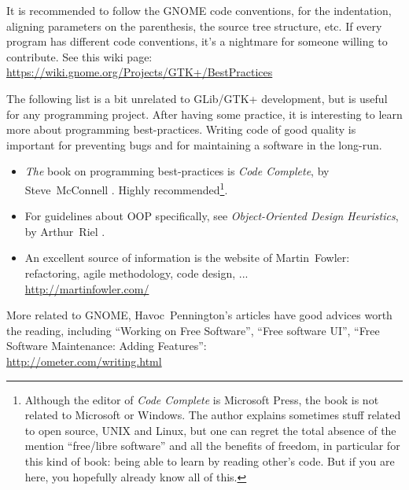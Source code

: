 It is recommended to follow the GNOME code conventions, for the indentation, aligning parameters on the parenthesis, the source tree structure, etc. If every program has different code conventions, it's a nightmare for someone willing to contribute. See this wiki page:\\
\url{https://wiki.gnome.org/Projects/GTK+/BestPractices}

The following list is a bit unrelated to GLib/GTK+ development, but is useful for any programming project. After having some practice, it is interesting to learn more about programming best-practices. Writing code of good quality is important for preventing bugs and for maintaining a software in the long-run.

\begin{itemize}
  \item \emph{The} book on programming best-practices is \emph{Code Complete}, by Steve~McConnell \cite{code-complete}. Highly recommended\footnote{Although the editor of \emph{Code Complete} is Microsoft Press, the book is not related to Microsoft or Windows. The author explains sometimes stuff related to open source, UNIX and Linux, but one can regret the total absence of the mention ``free/libre software'' and all the benefits of freedom, in particular for this kind of book: being able to learn by reading other's code. But if you are here, you hopefully already know all of this.}.

  \item For guidelines about OOP specifically, see \emph{Object-Oriented Design Heuristics}, by Arthur~Riel \cite{oop-book}.

  \item An excellent source of information is the website of Martin~Fowler: refactoring, agile methodology, code design, ...\\
  \url{http://martinfowler.com/}
\end{itemize}

More related to GNOME, Havoc~Pennington's articles have good advices worth the reading, including ``Working on Free Software'', ``Free software UI'', ``Free Software Maintenance: Adding Features'':\\
\url{http://ometer.com/writing.html}
